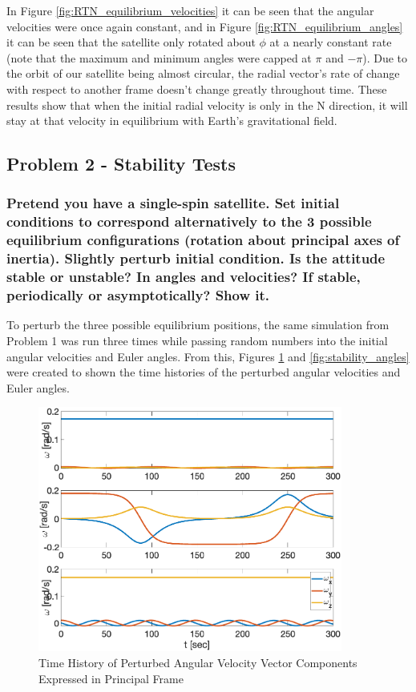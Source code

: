 In Figure \ref{fig:RTN_equilibrium_velocities} it can be seen that the angular velocities were once again constant, and in Figure \ref{fig:RTN_equilibrium_angles} it can be seen that the satellite only rotated about $\phi$ at a nearly constant rate (note that the maximum and minimum angles were capped at $\pi$ and $-\pi$). Due to the orbit of our satellite being almost circular, the radial vector's rate of change with respect to another frame doesn't change greatly throughout time. These results show that when the initial radial velocity is only in the N direction, it will stay at that velocity in equilibrium with Earth's gravitational field.

\subsection{Problem 2 - Stability Tests}

\subsubsection{Pretend you have a single-spin satellite. Set initial conditions to correspond alternatively to the 3
possible equilibrium configurations (rotation about principal axes of inertia). Slightly perturb initial
condition. Is the attitude stable or unstable? In angles and velocities? If stable, periodically or
asymptotically? Show it.}

To perturb the three possible equilibrium positions, the same simulation from Problem 1 was run three times while passing random numbers into the initial angular velocities and Euler angles. From this, Figures \ref{fig:stability_velocities} and \ref{fig:stability_angles} were created to shown the time histories of the perturbed angular velocities and Euler angles.

\begin{figure}[H]
    \centering
    \captionsetup{ justification = centering}
    \includegraphics[width = 10cm]{Images/PS4/stability_history_velocity.png}
    \caption{Time History of Perturbed Angular Velocity Vector Components Expressed in Principal Frame}
    \label{fig:stability_velocities}
\end{figure}

